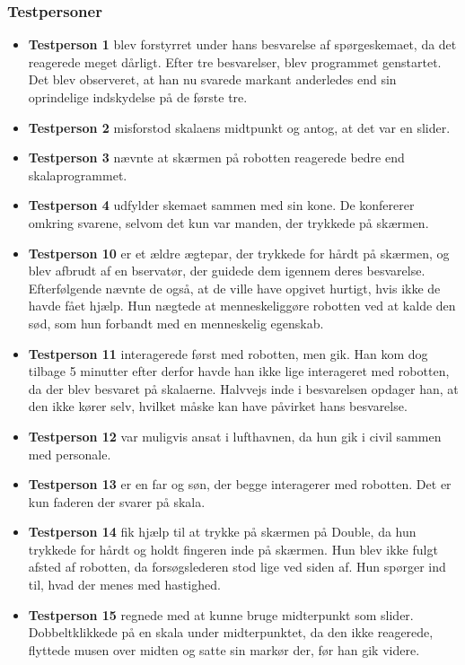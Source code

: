 \subsubsection{Testpersoner}
\begin{itemize}
\item \textbf{Testperson 1} blev forstyrret under hans besvarelse af spørgeskemaet, da det reagerede meget dårligt. Efter tre besvarelser, blev programmet genstartet. Det blev observeret, at han nu svarede markant anderledes end sin oprindelige indskydelse på de første tre. 
\item \textbf{Testperson 2}  misforstod skalaens midtpunkt og antog, at det var en slider. 
\item \textbf{Testperson 3} nævnte at skærmen på robotten reagerede bedre end skalaprogrammet.
\item \textbf{Testperson 4} udfylder skemaet sammen med sin kone. De konfererer omkring svarene, selvom det kun var manden, der trykkede på skærmen.
\item 	\textbf{Testperson 10} er et ældre ægtepar, der trykkede for hårdt på skærmen, og blev afbrudt af en bservatør, der guidede dem igennem deres besvarelse. Efterfølgende nævnte de også, at de ville have opgivet hurtigt, hvis ikke de havde fået hjælp. Hun nægtede at menneskeliggøre robotten ved at kalde den sød, som hun forbandt med en menneskelig egenskab.
\item \textbf{Testperson 11} interagerede først med robotten, men gik. Han kom dog tilbage 5 minutter efter derfor havde han ikke lige interageret med robotten, da der blev besvaret på skalaerne. Halvvejs inde i besvarelsen opdager han, at den ikke kører selv, hvilket måske kan have påvirket hans besvarelse.
\item \textbf{Testperson 12} var muligvis ansat i lufthavnen, da hun gik i civil sammen med personale.
\item 	\textbf{Testperson 13} er en far og søn, der begge interagerer med robotten. Det er kun faderen der svarer på skala.
\item \textbf{Testperson 14} fik hjælp til at trykke på skærmen på Double, da hun trykkede for hårdt og holdt fingeren inde på skærmen. Hun blev ikke fulgt afsted af robotten, da forsøgslederen stod lige ved siden af. Hun spørger ind til, hvad der menes med hastighed.
\item \textbf{Testperson 15} regnede med at kunne bruge midterpunkt som slider. Dobbeltklikkede på en skala under midterpunktet, da den ikke reagerede, flyttede musen over midten og satte sin markør der, før han gik videre.

\end{itemize}
